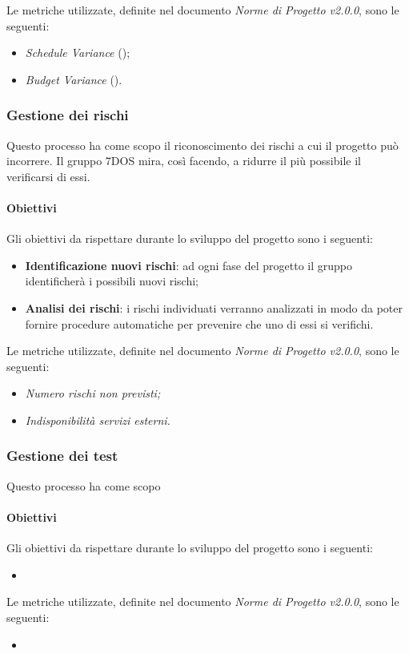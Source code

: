 Le metriche utilizzate, definite nel documento \emph{Norme di Progetto v2.0.0}, sono le seguenti:
\begin{itemize}
			\item{\emph{Schedule Variance} ();}
			\item{\emph{Budget Variance} ().}
\end{itemize}

\subsubsection{Gestione dei rischi} 
Questo processo ha come scopo il riconoscimento dei rischi a cui il progetto può incorrere. Il gruppo 7DOS mira, così facendo, a ridurre il più possibile il verificarsi di essi.
\paragraph{Obiettivi} \Spazio
Gli obiettivi da rispettare durante lo sviluppo del progetto sono i seguenti:
\begin{itemize}
	\item{\textbf{Identificazione nuovi rischi}: ad ogni fase del progetto il gruppo identificherà i possibili nuovi rischi;}
	\item{\textbf{Analisi dei rischi}: i rischi individuati verranno analizzati in modo da poter fornire procedure automatiche per prevenire che uno di essi si verifichi.}
\end{itemize}
Le metriche utilizzate, definite nel documento \emph{Norme di Progetto v2.0.0}, sono le seguenti:
\begin{itemize}
	\item\emph{Numero rischi non previsti;}
	\item\emph{Indisponibilità servizi esterni.}
\end{itemize}

\subsubsection{Gestione dei test} 
Questo processo ha come scopo 
\paragraph{Obiettivi} \Spazio
Gli obiettivi da rispettare durante lo sviluppo del progetto sono i seguenti:
\begin{itemize}
	\item{}
\end{itemize}
Le metriche utilizzate, definite nel documento \emph{Norme di Progetto v2.0.0}, sono le seguenti:
\begin{itemize}
	\item{}
\end{itemize}


